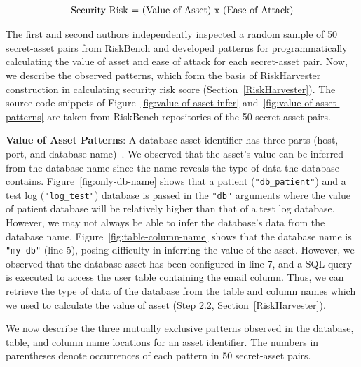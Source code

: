 \begin{gather} \label{eqriskscore}
    \begin{aligned}[b]
        \textnormal{Security Risk = (Value of Asset) x (Ease of Attack)}
   \end{aligned}  
\end{gather}

The first and second authors independently inspected a random sample of 50 secret-asset pairs from RiskBench and developed patterns for programmatically calculating the value of asset and ease of attack for each secret-asset pair. Now, we describe the observed patterns, which form the basis of RiskHarvester construction in calculating security risk score (Section~\ref{RiskHarvester}). The source code snippets of Figure~\ref{fig:value-of-asset-infer} and~\ref{fig:value-of-asset-patterns} are taken from RiskBench repositories of the 50 secret-asset pairs.

\textbf{Value of Asset Patterns}: A database asset identifier has three parts (host, port, and database name)~\cite{asset-identifier}. We observed that the asset's value can be inferred from the database name since the name reveals the type of data the database contains. Figure~\ref{fig:only-db-name} shows that a patient (\texttt{"db\_patient"}) and a test log (\texttt{"log\_test"}) database is passed in the \texttt{"db"} arguments where the value of patient database will be relatively higher than that of a test log database. However, we may not always be able to infer the database's data from the database name. Figure~\ref{fig:table-column-name} shows that the database name is \texttt{"my-db"} (line 5), posing difficulty in inferring the value of the asset. However, we observed that the database asset has been configured in line 7, and a SQL query is executed to access the user table containing the email column. Thus, we can retrieve the type of data of the database from the table and column names which we used to calculate the value of asset (Step 2.2, Section~\ref{RiskHarvester}). 

We now describe the three mutually exclusive patterns observed in the database, table, and column name locations for an asset identifier. The numbers in parentheses denote occurrences of each pattern in 50 secret-asset pairs.

